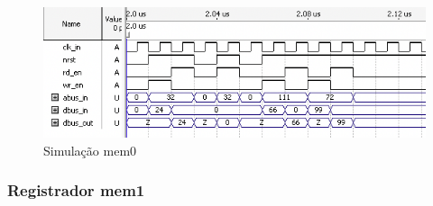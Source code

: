 \documentclass{article}
\begin{document}
\begin{figure}[ht]
    \begin{center}
        \includegraphics[width=15cm]{images/ram-mem0.png}
        \caption{Simulação mem0}
\end{center}
\end{figure}

\subsubsection{Registrador mem1}
\end{document}
